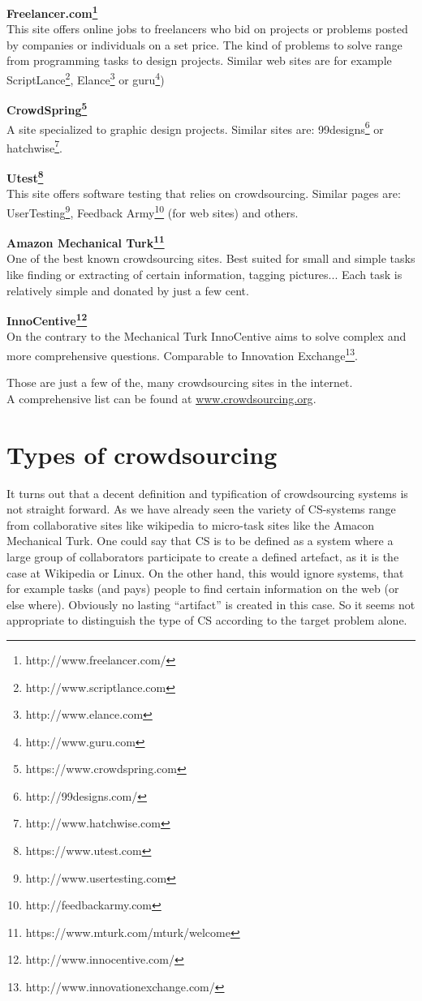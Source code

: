 \documentclass{acm_proc_article-sp}
\begin{document}
  \textbf{Freelancer.com\footnote{http://www.freelancer.com/}}\\
  This site offers online jobs to freelancers who bid on projects or problems posted by companies or individuals on a set price. The kind of problems to solve range from programming tasks to design projects. Similar web sites are for example ScriptLance\footnote{http://www.scriptlance.com}, Elance\footnote{http://www.elance.com} or guru\footnote{http://www.guru.com})

  \textbf{CrowdSpring\footnote{https://www.crowdspring.com}}\\
  A site specialized to graphic design projects. Similar sites are: 99designs\footnote{http://99designs.com/} or hatchwise\footnote{http://www.hatchwise.com}.

  \textbf{Utest\footnote{https://www.utest.com}}\\
  This site offers software testing that relies on crowdsourcing. Similar pages are: UserTesting\footnote{http://www.usertesting.com}, Feedback Army\footnote{http://feedbackarmy.com} (for web sites) and others.

  \textbf{Amazon Mechanical Turk\footnote{https://www.mturk.com/mturk/welcome}}\\
  One of the best known crowdsourcing sites. Best suited for small and simple tasks like finding or extracting of certain information, tagging pictures... Each task is relatively simple and donated by just a few cent.

  \textbf{InnoCentive\footnote{http://www.innocentive.com/}}\\
  On the contrary to the Mechanical Turk InnoCentive aims to solve complex and more comprehensive questions. Comparable to Innovation Exchange\footnote{http://www.innovationexchange.com/}.

  Those are just a few of the, many crowdsourcing sites in the internet. \\A comprehensive list can be found at \href{http://www.crowdsourcing.org/directory}{www.crowdsourcing.org}.

  \section{Types of crowdsourcing}
  \label{sect:types}
  It turns out that a decent definition and typification of crowdsourcing systems is not straight forward. As we have already seen the variety of CS-systems range from collaborative sites like wikipedia to micro-task sites like the Amacon Mechanical Turk. One could say that CS is to be defined as a system where a large group of collaborators participate to create a defined artefact, as it is the case at Wikipedia or Linux. On the other hand, this would ignore systems, that for example tasks (and pays) people to find certain information on the web (or else where). Obviously no lasting ``artifact'' is created in this case. So it seems not appropriate to distinguish the type of CS according to the target problem alone.
\end{document}

